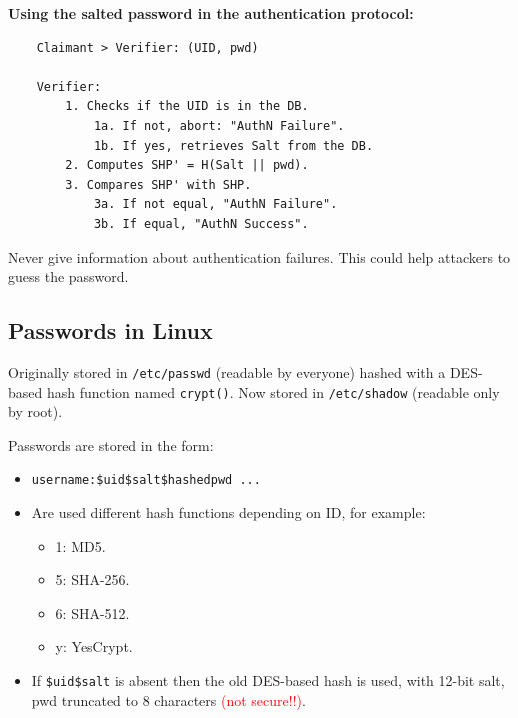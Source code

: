\vspace{0.3cm}

\begin{center}
    \textbf{Using the salted password in the authentication protocol:}
\end{center}
\begin{verbatim}
    Claimant > Verifier: (UID, pwd)

    Verifier:
        1. Checks if the UID is in the DB.
            1a. If not, abort: "AuthN Failure".
            1b. If yes, retrieves Salt from the DB.
        2. Computes SHP' = H(Salt || pwd).
        3. Compares SHP' with SHP.
            3a. If not equal, "AuthN Failure".
            3b. If equal, "AuthN Success".
\end{verbatim}

\begin{tcolorbox}[colback=red!10!white, colframe=red!70!black, coltitle=white, title=Beware]
Never give information about authentication failures. This could help attackers to guess the password.
\end{tcolorbox}

\subsection*{Passwords in Linux}
Originally stored in \texttt{/etc/passwd} (readable by everyone) hashed with a DES-based hash function named \texttt{crypt()}. Now stored in \texttt{/etc/shadow} (readable only by root).

\vspace{0.2cm}

Passwords are stored in the form:
\begin{itemize}
    \item \texttt{username:\$uid\$salt\$hashedpwd ...}
    \item Are used different hash functions depending on ID, for example:
    \begin{itemize}
        \item 1: MD5.
        \item 5: SHA-256.
        \item 6: SHA-512.
        \item y: YesCrypt.
    \end{itemize}
    \item If \texttt{\$uid\$salt} is absent then the old DES-based hash is used, with 12-bit salt, pwd truncated to 8 characters \textcolor{Red}{(not secure!!)}.
\end{itemize}

